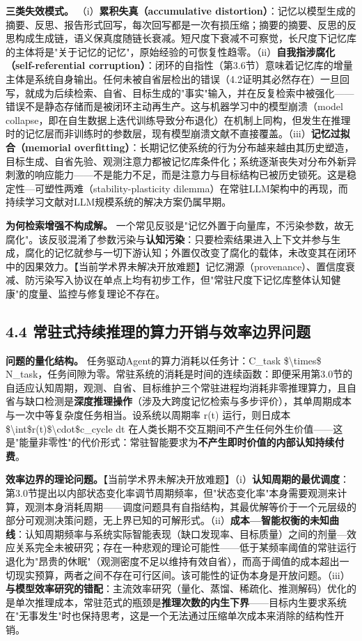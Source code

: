 \documentclass[11pt,a4paper]{ctexart}
\begin{document}
\textbf{三类失效模式。} （i）\textbf{累积失真（accumulative distortion）}：记忆以模型生成的摘要、反思、报告形式回写，每次回写都是一次有损压缩；摘要的摘要、反思的反思构成生成链，语义保真度随链长衰减。短尺度下衰减不可察觉，长尺度下记忆库的主体将是"关于记忆的记忆"，原始经验的可恢复性趋零。（ii）\textbf{自我指涉腐化（self-referential corruption）}：闭环的自指性（第3.6节）意味着记忆库的增量主体是系统自身输出。任何未被自省层检出的错误（4.2证明其必然存在）一旦回写，就成为后续检索、自省、目标生成的"事实"输入，并在反复检索中被强化——错误不是静态存储而是被闭环主动再生产。这与机器学习中的模型崩溃（model collapse，即在自生数据上迭代训练导致分布退化）在机制上同构，但发生在推理时的记忆层而非训练时的参数层，现有模型崩溃文献不直接覆盖。（iii）\textbf{记忆过拟合（memorial overfitting）}：长期记忆使系统的行为分布越来越由其历史塑造，目标生成、自省先验、观测注意力都被记忆库条件化；系统逐渐丧失对分布外新异刺激的响应能力——不是能力不足，而是注意力与目标结构已被历史锁死。这是稳定性—可塑性两难（stability-plasticity dilemma）在常驻LLM架构中的再现，而持续学习文献对LLM规模系统的解决方案仍属早期。

\textbf{为何检索增强不构成解。} 一个常见反驳是"记忆外置于向量库，不污染参数，故无腐化"。该反驳混淆了参数污染与\textbf{认知污染}：只要检索结果进入上下文并参与生成，腐化的记忆就参与一切下游认知；外置仅改变了腐化的载体，未改变其在闭环中的因果效力。【当前学术界未解决开放难题】记忆溯源（provenance）、置信度衰减、防污染写入协议在单点上均有初步工作，但"常驻尺度下记忆库整体认知健康"的度量、监控与修复理论不存在。

\subsection{4.4 常驻式持续推理的算力开销与效率边界问题}

\textbf{问题的量化结构。} 任务驱动Agent的算力消耗以任务计：C\_task \$\textbackslash{}times\$ N\_task，任务间隙为零。常驻系统的消耗是时间的连续函数：即便采用第3.0节的自适应认知周期，观测、自省、目标维护三个常驻进程均消耗非零推理算力，且自省与缺口检测是\textbf{深度推理操作}（涉及大跨度记忆检索与多步评价），其单周期成本与一次中等复杂度任务相当。设系统以周期率 r(t) 运行，则日成本 \$\textbackslash{}int\$r(t)\$\textbackslash{}cdot\$c\_cycle dt 在人类长期不交互期间不产生任何外生价值——这是"能量非零性"的代价形式：常驻智能要求为\textbf{不产生即时价值的内部认知持续付费}。

\textbf{效率边界的理论问题。}【当前学术界未解决开放难题】（i）\textbf{认知周期的最优调度}：第3.0节提出以内部状态变化率调节周期频率，但"状态变化率"本身需要观测来计算，观测本身消耗周期——调度问题具有自指结构，其最优解等价于一个元层级的部分可观测决策问题，无上界已知的可解形式。（ii）\textbf{成本—智能权衡的未知曲线}：认知周期频率与系统实际智能表现（缺口发现率、目标质量）之间的剂量—效应关系完全未被研究；存在一种悲观的理论可能性——低于某频率阈值的常驻运行退化为"昂贵的休眠"（观测密度不足以维持有效自省），而高于阈值的成本超出一切现实预算，两者之间不存在可行区间。该可能性的证伪本身是开放问题。（iii）\textbf{与模型效率研究的错配}：主流效率研究（量化、蒸馏、稀疏化、推测解码）优化的是单次推理成本，常驻范式的瓶颈是\textbf{推理次数的内生下界}——目标内生要求系统在"无事发生"时也保持思考，这是一个无法通过压缩单次成本来消除的结构性开销。
\end{document}
